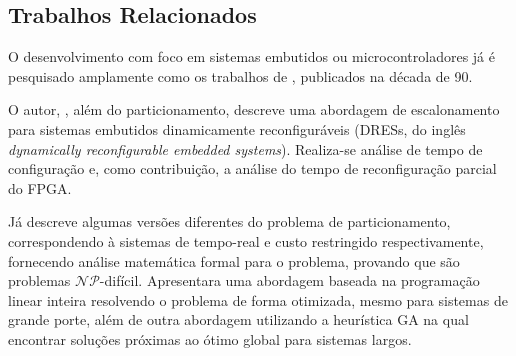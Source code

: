 \subsection{Trabalhos Relacionados}  \label{chap:relacionados}
   O desenvolvimento com foco em sistemas embutidos ou microcontroladores já é pesquisado amplamente como os trabalhos de \cite{Ernst1993, Gupta1995, Hardt1995, Gajski1994, Bolsens1997}, publicados na década de 90.

   O autor, \cite{Mei2000}, além do particionamento, descreve uma abordagem de escalonamento para sistemas embutidos dinamicamente reconfiguráveis (DRESs, do inglês \textit{dynamically reconfigurable embedded systems}). %
   Realiza-se análise de tempo de configuração e, como contribuição, a análise do tempo de reconfiguração parcial do FPGA.

   Já \cite{Arato2003} descreve algumas versões diferentes do problema de particionamento, correspondendo à sistemas de tempo-real e custo restringido respectivamente, fornecendo análise matemática formal para o problema, provando que são problemas $ \mathcal{NP} $-difícil.
   Apresentara uma abordagem baseada na programação linear inteira resolvendo o problema de forma otimizada, mesmo para sistemas de grande porte, além de outra abordagem utilizando a heurística GA na qual encontrar soluções próximas ao ótimo global para sistemas largos.

